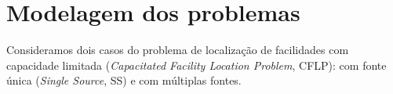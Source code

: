 \documentclass[]{article}
\title{}
\begin{document}
\maketitle

\begin{abstract}

\end{abstract}


\section{Modelagem dos problemas}

	Consideramos dois casos do problema de localização de facilidades com capacidade limitada 
	(\textit{Capacitated Facility Location Problem}, CFLP):
	com fonte única (\textit{Single Source}, SS) 
	e com múltiplas fontes. 
	
	
	
\end{document}

